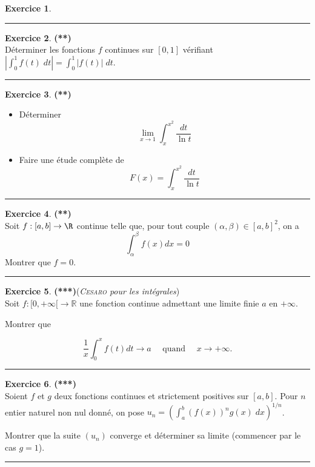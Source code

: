 \documentclass[a4paper,11pt]{article}
\theoremstyle{definition}
\newtheorem{exo}{Exercice} %
\begin{document}
\begin{minipage}{1\linewidth}
\begin{minipage}[t]{0.48\linewidth}
\begin{exo}
	\centering\rule{1\linewidth}{0.6pt}\end{exo}


\begin{exo}\textbf{(**)}\quad\\[0.2cm]
	Déterminer les fonctions $f$ continues sur $[0,1]$ vérifiant $\displaystyle\left|\int_{0}^{1}f(t)\;dt\right|=\int_{0}^{1}|f(t)|\;dt$.	
	
	\centering\rule{1\linewidth}{0.6pt}\end{exo}




\begin{exo}\textbf{(**)}\quad\\[0.2cm]
	\begin{itemize}
		\item  Déterminer $$\displaystyle\lim_{x\rightarrow 1}\int_{x}^{x^2}\frac{dt}{\ln t}$$ 
		\item  Faire une étude complète de $$\displaystyle F(x)=\int_{x}^{x^2}\frac{dt}{\ln t}$$
	\end{itemize}
	\centering\rule{1\linewidth}{0.6pt}\end{exo}

\begin{exo}\textbf{(**)}\quad\\[0.2cm]
	Soit $f:[a,b]\to\R$ continue telle que, pour tout couple $(\alpha,\beta)\in[a,b]^2$, on a $$\displaystyle \int_{\alpha}^{\beta}f(x)dx=0$$ Montrer que $f=0$.
	
	
	
\centering\rule{1\linewidth}{0.6pt}\end{exo}


\begin{exo}\textbf{(***)}\quad(\textit{\textsc{Cesaro} pour les intégrales})\\[0.2cm]
	Soit $f:[0,+\infty[\to\mathbb R$ une fonction continue admettant une limite finie $a$ en $+\infty$.
	
	Montrer que
	
	$$\displaystyle\dfrac 1x\int_0^x f(t)dt\to a\quad\textrm{  quand  }\quad x\to+\infty.$$
	
	
	\centering\rule{1\linewidth}{0.6pt}\end{exo}

\begin{exo}\textbf{(***)}\quad\\[0.2cm]
	Soient $f$ et $g$ deux fonctions continues et strictement positives sur $[a,b]$. Pour $n$ entier naturel non nul donné, on pose $u_n=\left(\int_{a}^{b}(f(x))^ng(x)\;dx\right)^{1/n}$.
	
	Montrer que la suite $(u_n)$ converge et déterminer sa limite (commencer par le cas $g=1$).
	
	\centering\rule{1\linewidth}{0.6pt}\end{exo}










\end{minipage}\end{minipage} \newpage
\end{document}
